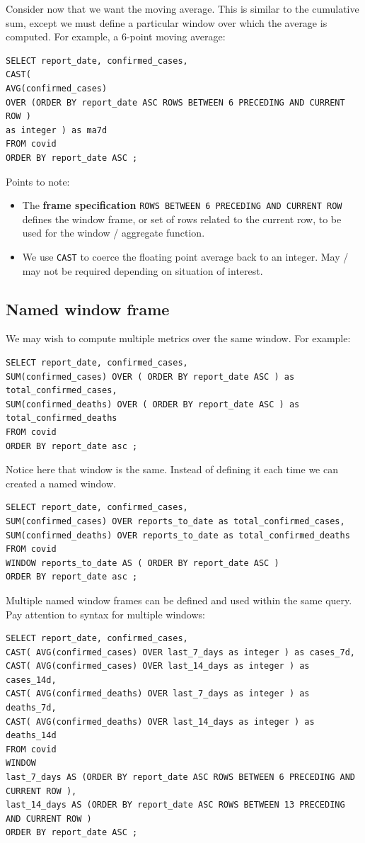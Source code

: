 \documentclass{pgnotes}
\begin{document}
Consider now that we want the moving average.
This is similar to the cumulative sum, except we must define a particular window over which the average is computed.
For example, a 6-point moving average: 
\begin{verbatim}
SELECT report_date, confirmed_cases, 
CAST(
AVG(confirmed_cases) 
OVER (ORDER BY report_date ASC ROWS BETWEEN 6 PRECEDING AND CURRENT ROW ) 
as integer ) as ma7d
FROM covid
ORDER BY report_date ASC ;
\end{verbatim}
Points to note: 
\begin{itemize}
\item The \textbf{frame specification} \texttt{ROWS BETWEEN 6 PRECEDING AND CURRENT ROW}  defines the window frame, or set of rows related to the current row, to be used for the window / aggregate function. 
\item We use \texttt{CAST} to coerce the floating point average back to an integer. May / may not be required depending on situation of interest.
\end{itemize}

\subsection{Named window frame}

We may wish to compute multiple metrics over the same window.
For example: 
\begin{verbatim}
SELECT report_date, confirmed_cases,
SUM(confirmed_cases) OVER ( ORDER BY report_date ASC ) as total_confirmed_cases,
SUM(confirmed_deaths) OVER ( ORDER BY report_date ASC ) as total_confirmed_deaths 
FROM covid 
ORDER BY report_date asc ;
\end{verbatim}
Notice here that window is the same.
Instead of defining it each time we can created a named window. 
\begin{verbatim}
SELECT report_date, confirmed_cases,
SUM(confirmed_cases) OVER reports_to_date as total_confirmed_cases,
SUM(confirmed_deaths) OVER reports_to_date as total_confirmed_deaths 
FROM covid 
WINDOW reports_to_date AS ( ORDER BY report_date ASC ) 
ORDER BY report_date asc ;
\end{verbatim}

Multiple named window frames can be defined and used within the same query.
Pay attention to syntax for multiple windows: 
\begin{verbatim}
SELECT report_date, confirmed_cases,
CAST( AVG(confirmed_cases) OVER last_7_days as integer ) as cases_7d,
CAST( AVG(confirmed_cases) OVER last_14_days as integer ) as cases_14d,
CAST( AVG(confirmed_deaths) OVER last_7_days as integer ) as deaths_7d,
CAST( AVG(confirmed_deaths) OVER last_14_days as integer ) as deaths_14d
FROM covid 
WINDOW
last_7_days AS (ORDER BY report_date ASC ROWS BETWEEN 6 PRECEDING AND CURRENT ROW ), 
last_14_days AS (ORDER BY report_date ASC ROWS BETWEEN 13 PRECEDING AND CURRENT ROW ) 
ORDER BY report_date ASC ;
\end{verbatim} 
\end{document}

